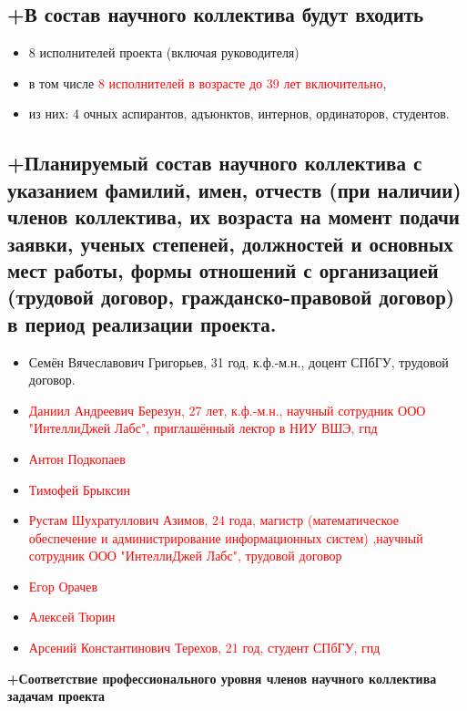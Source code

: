\documentclass[12pt]{article}  %
\theoremstyle{remark}
\newcommand{\checkme}[1]{\textcolor{red}{#1}}
\begin{document}
\subsection{+В состав научного коллектива будут входить}
%
\begin{itemize}
\item 8 исполнителей проекта (включая руководителя)
\item в том числе \checkme{8  исполнителей в возрасте до 39 лет включительно},
\item из них: 4 очных аспирантов, адъюнктов, интернов, ординаторов, студентов.
\end{itemize}

\subsection{+Планируемый состав научного коллектива с указанием фамилий, имен, отчеств (при наличии) членов коллектива, их возраста на момент подачи заявки, ученых степеней, должностей и основных мест работы, формы отношений с организацией (трудовой договор, гражданско-правовой договор) в период реализации проекта.}

\begin{itemize}
  \item Семён Вячеславович Григорьев, 31 год, к.ф.-м.н., доцент СПбГУ, трудовой договор.
  \item \checkme{Даниил Андреевич Березун, 27 лет, к.ф.-м.н., научный сотрудник ООО "ИнтеллиДжей Лабс", приглашённый лектор в НИУ ВШЭ, гпд}
  \item \checkme{Антон Подкопаев}
  \item \checkme{Тимофей	Брыксин}
  \item \checkme{Рустам Шухратуллович Азимов, 24 года, магистр (математическое обеспечение и администрирование информационных систем) ,научный сотрудник ООО "ИнтеллиДжей Лабс", трудовой договор}
  \item \checkme{Егор Орачев}
  \item \checkme{Алексей Тюрин}
  \item \checkme{Арсений Константинович Терехов, 21 год, студент СПбГУ, гпд}
\end{itemize}



\textbf{+Соответствие профессионального уровня членов научного коллектива задачам проекта}
\end{document}
